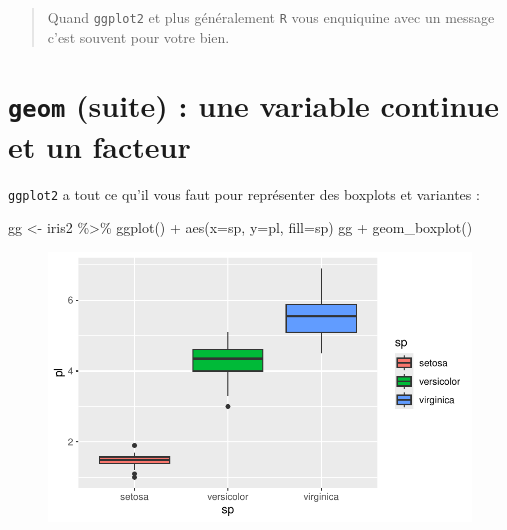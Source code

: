 \documentclass[
  letterpaper,
  DIV=11,
  numbers=noendperiod]{scrreprt}
\newenvironment{Shaded}{\begin{snugshade}}{\end{snugshade}}
\newcommand{\AttributeTok}[1]{\textcolor[rgb]{0.40,0.45,0.13}{#1}}
\newcommand{\FunctionTok}[1]{\textcolor[rgb]{0.28,0.35,0.67}{#1}}
\newcommand{\NormalTok}[1]{\textcolor[rgb]{0.00,0.23,0.31}{#1}}
\newcommand{\OtherTok}[1]{\textcolor[rgb]{0.00,0.23,0.31}{#1}}
\newcommand{\SpecialCharTok}[1]{\textcolor[rgb]{0.37,0.37,0.37}{#1}}
\begin{document}
\begin{quote}
Quand \texttt{ggplot2} et plus généralement \texttt{R} vous enquiquine
avec un message c'est souvent pour votre bien.
\end{quote}

\hypertarget{geom-suite-une-variable-continue-et-un-facteur}{%
\section{\texorpdfstring{\texttt{geom} (suite) : une variable continue
et un
facteur}{geom (suite) : une variable continue et un facteur}}\label{geom-suite-une-variable-continue-et-un-facteur}}

\texttt{ggplot2} a tout ce qu'il vous faut pour représenter des boxplots
et variantes :

\begin{Shaded}
\begin{Highlighting}[]
\NormalTok{gg }\OtherTok{\textless{}{-}}\NormalTok{ iris2 }\SpecialCharTok{\%\textgreater{}\%} \FunctionTok{ggplot}\NormalTok{() }\SpecialCharTok{+} \FunctionTok{aes}\NormalTok{(}\AttributeTok{x=}\NormalTok{sp, }\AttributeTok{y=}\NormalTok{pl, }\AttributeTok{fill=}\NormalTok{sp)}
\NormalTok{gg }\SpecialCharTok{+} \FunctionTok{geom\_boxplot}\NormalTok{()}
\end{Highlighting}
\end{Shaded}

\begin{figure}[H]

{\centering \includegraphics{ggplot2_files/figure-pdf/unnamed-chunk-25-1.pdf}

}

\end{figure}
\end{document}
